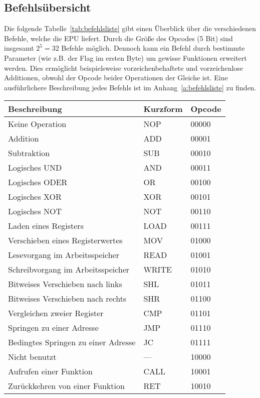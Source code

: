 \subsection{Befehlsübersicht}
Die folgende Tabelle~\ref{tab:befehlsliste} gibt einen Überblick über die
verschiedenen Befehle, welche die \ac{EPU} liefert. Durch die Größe des Opcodes (5 Bit)
sind insgesamt $2^5 = 32$ Befehle möglich. Dennoch kann ein Befehl durch
bestimmte Parameter (wie z.B. der Flag im ersten Byte) um gewisse Funktionen
erweitert werden. Dies ermöglicht beispielsweise vorzeichenbehaftete und
vorzeichenlose Additionen, obwohl der Opcode beider Operationen der Gleiche ist.
Eine ausführlichere Beschreibung jedes Befehls ist im
Anhang~\ref{a:befehlsliste} zu finden.
\begin{table}[htb]
\centering
\begin{tabular}{lll}
\toprule
Beschreibung									& Kurzform	& Opcode\\
\midrule
Keine Operation									& NOP		& 00000\\
Addition										& ADD   	& 00001\\
Subtraktion										& SUB   	& 00010\\
Logisches UND									& AND   	& 00011\\
Logisches ODER									& OR    	& 00100\\
Logisches XOR									& XOR   	& 00101\\
Logisches NOT									& NOT   	& 00110\\
Laden eines Registers							& LOAD  	& 00111\\
Verschieben eines Registerwertes				& MOV   	& 01000\\
Lesevorgang im Arbeitsspeicher					& READ  	& 01001\\
Schreibvorgang im Arbeitsspeicher				& WRITE 	& 01010\\
Bitweises Verschieben nach links				& SHL   	& 01011\\
Bitweises Verschieben nach rechts				& SHR   	& 01100\\
Vergleichen zweier Register						& CMP   	& 01101\\
Springen zu einer Adresse						& JMP   	& 01110\\
Bedingtes Springen zu einer Adresse				& JC    	& 01111\\
Nicht benutzt									& ---   	& 10000\\
Aufrufen einer Funktion							& CALL  	& 10001\\
Zurückkehren von einer Funktion					& RET   	& 10010\\

\end{tabular}
\end{table}
